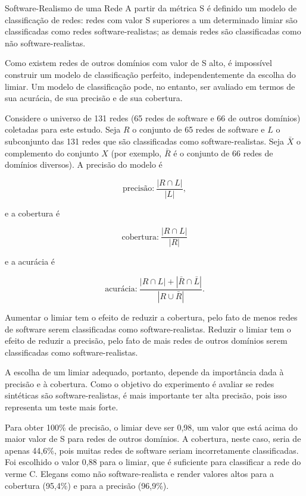 \begin{section}{Software-Realismo de uma Rede}
A partir da métrica S é definido um modelo de classificação de redes: redes com valor S superiores a um determinado limiar são classificadas como redes software-realistas; as demais redes são classificadas como não software-realistas.

Como existem redes de outros domínios com valor de S alto, é impossível construir um modelo de classificação perfeito, independentemente da escolha do limiar. Um modelo de classificação pode, no entanto, ser avaliado em termos de sua acurácia, de sua precisão e de sua cobertura. 

Considere o universo de 131 redes (65 redes de software e 66 de outros domínios) coletadas para este estudo. Seja $R$ o conjunto de 65 redes de software e $L$ o subconjunto das 131 redes que são classificadas como software-realistas. Seja $\bar{X}$ o complemento do conjunto $X$ (por exemplo, $\bar{R}$ é o conjunto de 66 redes de domínios diversos). A precisão do modelo é

$$
\mbox{precisão:} ~\frac{|R \cap L|}{|L|},
$$

e a cobertura é

$$
\mbox{cobertura:} ~\frac{|R \cap L|}{|R|}
$$

e a acurácia é

$$
\mbox{acurácia:} ~\frac{|R \cap L| + |\bar{R} \cap \bar{L}|}{|R \cup \bar{R}|}.
$$


Aumentar o limiar tem o efeito de reduzir a cobertura, pelo fato de menos redes de software serem classificadas como software-realistas. Reduzir o limiar tem o efeito de reduzir a precisão, pelo fato de mais redes de outros domínios serem classificadas como software-realistas.

A escolha de um limiar adequado, portanto, depende da importância dada à precisão e à cobertura. Como o objetivo do experimento é avaliar se redes sintéticas são software-realistas, é mais importante ter alta precisão, pois isso representa um teste mais forte.

Para obter 100\% de precisão, o limiar deve ser 0,98, um valor que está acima do maior valor de S para redes de outros domínios. A cobertura, neste caso, seria de apenas 44,6\%, pois muitas redes de software seriam incorretamente classificadas. Foi escolhido o valor 0,88 para o limiar, que é suficiente para classificar a rede do verme C. Elegans como não software-realista e render valores altos para a cobertura (95,4\%) e para a precisão (96,9\%).

\end{section}

